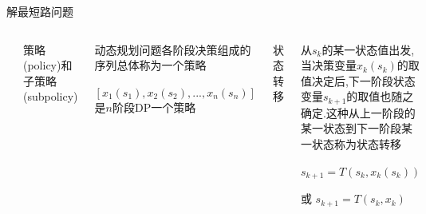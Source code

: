 \begin{frame}{解最短路问题}
    \begin{columns}
            \includegraphics[width=\textwidth]{fig/4-1.png}
            \begin{enumerate}[(4)]
                \scriptsize{\item 策略(policy)和子策略(subpolicy)}
            \end{enumerate}
            \begin{itemize}
                \scriptsize{\item 动态规划问题各阶段决策组成的序列总体称为一个策略}
                \item $[x_1(s_1),x_2(s_2),...,x_n(s_n)]$是$n$阶段DP一个策略
            \end{itemize}
            \pause
            \begin{enumerate}[(5)]
                \scriptsize{\item 状态转移}
            \end{enumerate}
            \begin{itemize}
                \scriptsize{\item 从$s_k$的某一状态值出发,当决策变量$x_k(s_k)$的取值决定后,下一阶段状态变量$s_{k+1}$的取值也随之确定.这种从上一阶段的某一状态到下一阶段某一状态称为状态转移}
                \item $s_{k+1}=T(s_k,x_k(s_k))$
                \item 或 $s_{k+1}=T(s_k,x_k)$
            \end{itemize}
    \end{columns}
\end{frame}
